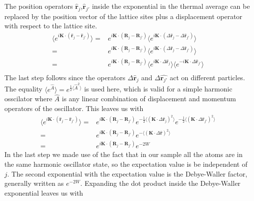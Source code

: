 \documentclass[11pt,letter]{article}
\newcommand{\bv}[1]{\ensuremath{\mathbf{#1}}}
\begin{document}
The position operators $\hat{\bv{r}}_{j}$,$\hat{\bv{r}}_{j'}$  inside the exponential in the thermal average can be replaced by the position vector of the lattice sites plus a displacement operator with respect to the lattice site.   
\begin{equation}
\begin{split} 
\langle e^{ i \bv{K} \cdot (  \hat{\bv{r}}_{j} - \hat{\bv{r}}_{j'} )  } \rangle = &   
e^{i \bv{K} \cdot ( \bv{R}_{j} - \bv{R}_{j'} ) } 
\langle e^{ i \bv{K} \cdot (  \Delta\hat{\bv{r}}_{j} - \Delta\hat{\bv{r}}_{j'} )  } \rangle \\   
= & e^{i \bv{K} \cdot ( \bv{R}_{j} - \bv{R}_{j'} ) } 
\langle e^{ i \bv{K} \cdot (  \Delta\hat{\bv{r}}_{j} - \Delta\hat{\bv{r}}_{j'} )  } \rangle \\ 
= & e^{i \bv{K} \cdot ( \bv{R}_{j} - \bv{R}_{j'} ) } 
\langle e^{ i \bv{K} \cdot  \Delta\hat{\bv{r}}_{j}} \rangle \langle    e^{ -i \bv{K} \cdot  \Delta\hat{\bv{r}}_{j'}   } \rangle \\ 
\end{split}
\end{equation} 
The last step follows since the operators $\Delta\hat{\bv{r}}_{j}$ and
$\Delta\hat{\bv{r}_{j'}}$  act on different particles.
The equality $\langle e^{\hat{A}} \rangle = e^{\frac{1}{2} \langle \hat{A}^{2} \rangle }$ is used here, 
which is valid for a simple harmonic osscilator where $\hat{A}$ is any linear
combination of displacement and momentum operators of the oscillator.  This leaves us with 
\begin{equation}
\begin{split} 
\langle e^{ i \bv{K} \cdot (  \hat{\bv{r}}_{j} - \hat{\bv{r}}_{j'} )  } \rangle = &   
 e^{i \bv{K} \cdot ( \bv{R}_{j} - \bv{R}_{j'} ) } 
 e^{ -\frac{1}{2} \langle (\bv{K} \cdot  \Delta\hat{\bv{r}}_{j})^{2} \rangle }
 e^{ -\frac{1}{2} \langle (\bv{K} \cdot  \Delta\hat{\bv{r}}_{j'})^{2}  \rangle }  \\
 = &  
 e^{i \bv{K} \cdot ( \bv{R}_{j} - \bv{R}_{j'} ) } 
 e^{ -\langle (\bv{K} \cdot  \Delta\hat{\bv{r}})^{2}  \rangle } \\
 = &  
 e^{i \bv{K} \cdot ( \bv{R}_{j} - \bv{R}_{j'} ) } 
 e^{ -2W} 
\end{split}
\end{equation} 
In the last step we made use of the fact that in our sample all the atoms are
in the same harmonic oscillator state, so the expectation value is be
independent of $j$.   The second exponential with the expectation value is the
Debye-Waller factor, generally written as $e^{-2W}$.  Expanding the dot product inside the Debye-Waller exponential leaves us with
\end{document}
